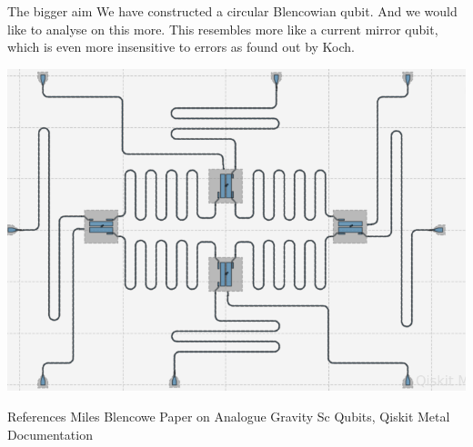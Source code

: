 \documentclass[11pt]{beamer}
\begin{document}
\begin{frame}{The bigger aim}
	We have constructed a circular Blencowian qubit. And we would like to analyse on this more. This resembles more like a current mirror qubit, which is even more insensitive to errors as found out by Koch.
	\begin{center}
		\includegraphics[width=8 cm]{sc14.png}
	\end{center}
\end{frame}

\begin{frame}{References}
	Miles Blencowe Paper on Analogue Gravity
	Sc Qubits, Qiskit Metal Documentation
\end{frame}

		
	
\end{document}
